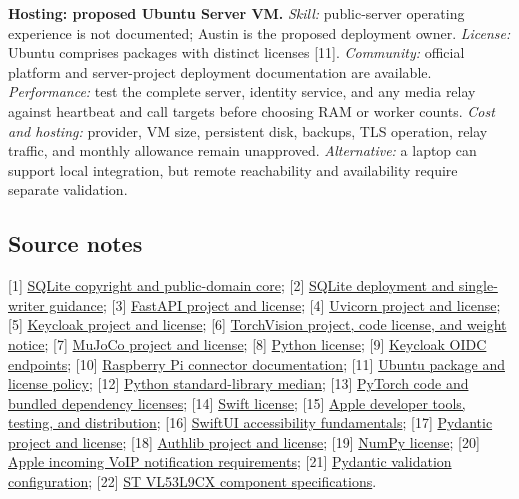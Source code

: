 \documentclass[12pt,letterpaper]{article}
\begin{document}
\textbf{Hosting: proposed Ubuntu Server VM.} \emph{Skill:} public-server operating experience is not documented; Austin is the proposed deployment owner. \emph{License:} Ubuntu comprises packages with distinct licenses [11]. \emph{Community:} official platform and server-project deployment documentation are available. \emph{Performance:} test the complete server, identity service, and any media relay against heartbeat and call targets before choosing RAM or worker counts. \emph{Cost and hosting:} provider, VM size, persistent disk, backups, TLS operation, relay traffic, and monthly allowance remain unapproved. \emph{Alternative:} a laptop can support local integration, but remote reachability and availability require separate validation.

\subsection*{Source notes}
\footnotesize
[1] \href{https://www.sqlite.org/copyright.html}{SQLite copyright and public-domain core};
[2] \href{https://www.sqlite.org/whentouse.html}{SQLite deployment and single-writer guidance};
[3] \href{https://github.com/fastapi/fastapi}{FastAPI project and license};
[4] \href{https://github.com/encode/uvicorn}{Uvicorn project and license};
[5] \href{https://github.com/keycloak/keycloak}{Keycloak project and license};
[6] \href{https://github.com/pytorch/vision}{TorchVision project, code license, and weight notice};
[7] \href{https://github.com/google-deepmind/mujoco}{MuJoCo project and license};
[8] \href{https://docs.python.org/3/license.html}{Python license};
[9] \href{https://www.keycloak.org/securing-apps/oidc-layers}{Keycloak OIDC endpoints};
[10] \href{https://www.raspberrypi.com/documentation/computers/sbcs.html}{Raspberry Pi connector documentation};
[11] \href{https://ubuntu.com/legal/intellectual-property-policy}{Ubuntu package and license policy};
[12] \href{https://docs.python.org/3/library/statistics.html}{Python standard-library median};
[13] \href{https://github.com/pytorch/pytorch/blob/main/pyproject.toml}{PyTorch code and bundled dependency licenses};
[14] \href{https://www.swift.org/legal/license.html}{Swift license};
[15] \href{https://developer.apple.com/programs/}{Apple developer tools, testing, and distribution};
[16] \href{https://developer.apple.com/documentation/SwiftUI/Accessibility-fundamentals}{SwiftUI accessibility fundamentals};
[17] \href{https://github.com/pydantic/pydantic}{Pydantic project and license};
[18] \href{https://github.com/authlib/authlib}{Authlib project and license};
[19] \href{https://numpy.org/doc/stable/license.html}{NumPy license};
[20] \href{https://developer.apple.com/documentation/pushkit/responding-to-voip-notifications-from-pushkit}{Apple incoming VoIP notification requirements};
[21] \href{https://docs.pydantic.dev/latest/api/config/}{Pydantic validation configuration};
[22] \href{https://www.st.com/en/imaging-and-photonics-solutions/vl53l9cx.html}{ST VL53L9CX component specifications}.

\normalsize
\end{document}
